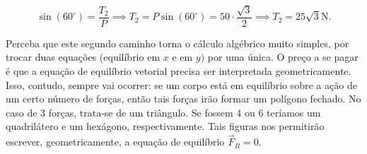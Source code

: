 \begin{exemplo}[Nível II]
$$ \sin(60^\circ) = \dfrac{T_2}{P} \implies T_2 = P \sin(60^\circ) = 50 \cdot \dfrac{\sqrt 3}{2} \implies \boxed{T_2 =25 \sqrt 3 \text{N}.} $$

Perceba que este segundo caminho torna o cálculo algébrico muito simples, por trocar duas equações (equilíbrio em $x$ e em $y)$ por uma única. O preço a se pagar é que a equação de equilíbrio vetorial precisa ser interpretada geometricamente. Isso, contudo, sempre vai ocorrer: se um corpo está em equilíbrio sobre a ação de um certo número de forças, então tais forças irão formar um polígono fechado. No caso de 3 forças, trata-se de um triângulo. Se fossem 4 ou 6 teríamos um quadrilátero e um hexágono, respectivamente. Tais figuras nos permitirão escrever, geometricamente, a equação de equilíbrio $\vec F_R =0.$



\end{exemplo}



\vspace{0.3cm}



